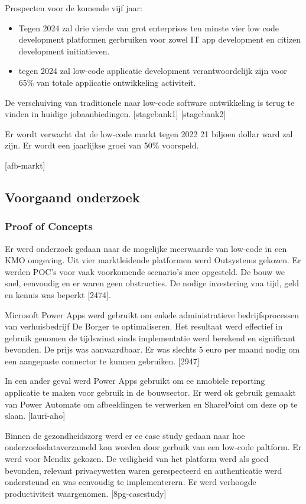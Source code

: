 Prospecten voor de komende vijf jaar:
\begin{itemize}
    \item Tegen 2024 zal drie vierde van grot enterprises ten minste vier low code development platformen gerbruiken voor zowel IT app development en citizen development initiatieven.
    \item tegen 2024 zal low-code applicatie development verantwoordelijk zijn voor 65\% van totale applicatie ontwikkeling activiteit.
\end{itemize}

De verschuiving van traditionele naar low-code software ontwikkeling is terug te vinden in huidige jobaanbiedingen. [stagebank1] [stagebank2]

Er wordt verwacht dat de low-code markt tegen 2022 21 biljoen dollar ward zal zijn. Er wordt een jaarlijkse groei van 50\% voorspeld.

[afb-markt]

\subsection{Voorgaand onderzoek}

\subsubsection{Proof of Concepts}

Er werd onderzoek gedaan naar de mogelijke meerwaarde van low-code in een KMO omgeving. Uit vier marktleidende platformen werd Outsystems gekozen. Er werden POC's voor vaak voorkomende scenario's mee opgesteld. De bouw we snel, eenvoudig en er waren geen obstructies. De nodige investering vna tijd, geld en kennis was beperkt [2474].

Microsoft Power Apps werd gebruikt om enkele administratieve bedrijfsprocessen van verhuisbedrijf De Borger te optimaliseren. Het resultaat werd effectief in gebruik genomen de tijdswinst sinds implementatie werd berekend en significant bevonden. De prijs was aanvaardbaar. Er was slechts 5 euro per maand nodig om een aangepaste connector te kunnen gebruiken. [2947]

In een ander geval werd Power Apps gebruikt om ee nmobiele reporting applicatie te maken voor gebruik in de bouwsector. Er werd ok gebruik gemaakt van Power Automate om afbeeldingen te verwerken en SharePoint om deze op te slaan. [lauri-aho]

Binnen de gezondheidszorg werd er ee case study gedaan naar hoe onderzoeksdataverzameld kon worden door gerbuik van een low-code paltform. Er werd voor Mendix gekozen. De veiligheid van het platform werd als goed bevonden, relevant privacywetten waren gerespecteerd en authenticatie werd ondersteund en was eenvoudig te implementerern. Er werd verhoogde productiviteit waargenomen. [8pg-casestudy]

